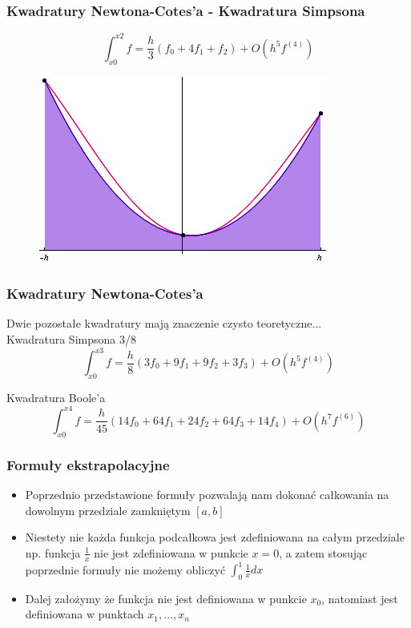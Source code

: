 \documentclass[compress,red]{beamer}
\begin{document}
	\begin{frame}
		\frametitle{Kwadratury Newtona-Cotes'a - Kwadratura Simpsona}
		\[ \int_{x0}^{x2} f = \frac{h}{3}(f_0 + 4f_1 + f_2) + O(h^5 f^{(4)}) \]
		\begin{figure}
			\includegraphics[scale=0.5]{./img/q_sim}
		\end{figure} 
	\end{frame}	
	
	\begin{frame}
		\frametitle{Kwadratury Newtona-Cotes'a}
		Dwie pozostałe kwadratury mają znaczenie czysto teoretyczne...
		\\[1cm]
		
		Kwadratura Simpsona 3/8
		\[ \int_{x0}^{x3} f = \frac{h}{8}(3f_0 + 9f_1 + 9f_2 + 3f_3) + O(h^5 f^{(4)}) \]
		
		Kwadratura Boole'a
		\[ \int_{x0}^{x4} f = \frac{h}{45}(14f_0 + 64f_1 + 24f_2 + 64f_3 + 14f_4) + O(h^7 f^{(6)}) \]
	\end{frame}	
	
	\begin{frame}
		\frametitle{Formuły ekstrapolacyjne} 
		\begin{itemize}
			\item
				Poprzednio przedstawione formuły pozwalają nam dokonać
				całkowania na dowolnym przedziale zamkniętym $[a, b]$
			\item
				Niestety nie każda funkcja podcałkowa jest zdefiniowana na 
				całym przedziale np. funkcja $\frac{1}{x}$ nie jest zdefiniowana 
				w punkcie $x = 0$, a zatem stosując poprzednie formuły nie możemy 
				obliczyć $\int_0^1 \frac{1}{x} dx$
			\item
				Dalej założymy że funkcja nie jest definiowana w punkcie $ x_0 $,
				natomiast jest definiowana w punktach $ x_1, \ldots, x_n $
		\end{itemize}
	\end{frame}	
	
\end{document}
